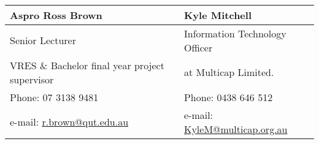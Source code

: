 \documentclass[a4paper,12pt]{article}
\begin{document}
{\begin{tabular}{ |p{8cm}||p{8cm}| }
	\hline
\end{tabular}
\\ [4pc]
\begin{tabular}{ |p{8cm}||p{8cm}| }
	\hline
	\textbf{Aspro Ross Brown} & \textbf{Kyle Mitchell} \\ 
	\hline
	Senior Lecturer                       & Information Technology Officer \\
    VRES \& Bachelor final year project supervisor & at Multicap Limited. \\
	\hline
	Phone: 07 3138 9481 & Phone: 0438 646 512  \\ %
	\hline
	 e-mail: \href{mailto:r.brown@qut.edu.au}{r.brown@qut.edu.au} &
	 e-mail: \href{mailto:KyleM@multicap.org.au}{KyleM@multicap.org.au} \\
	\hline
\end{tabular}
\\ [4pc]
}



\newpage
{}
{


}{}
\end{document}
